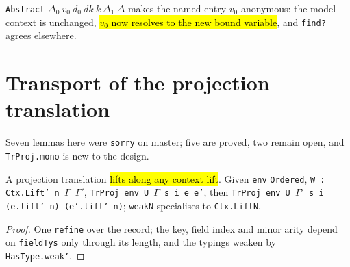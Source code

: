 \begin{definition}
\label{ind:vt-abstract}
\leanok
{}
 \texttt{Abstract} $\Delta_0\ v_0\ d_0\ dk\ k\ \Delta_1\ \Delta$ makes the named entry $v_0$ anonymous: the model context is unchanged, \hl{$v_0$ now resolves to the new bound variable}, and \texttt{find?} agrees elsewhere.
\end{definition}

\section{Transport of the projection translation}

Seven lemmas here were \texttt{sorry} on master; five are proved, two remain open, and \texttt{TrProj.mono} is new to the design.

\begin{theorem}
\label{thm:trproj-weak}
\leanok
{}
 

 A projection translation \hl{lifts along any context lift}. Given \texttt{env} \texttt{Ordered}, \texttt{W : Ctx.Lift' n $\Gamma$ $\Gamma'$}, \texttt{TrProj env U $\Gamma$ s i e e'}, then \texttt{TrProj env U $\Gamma'$ s i (e.lift' n) (e'.lift' n)}; \texttt{weakN} specialises to \texttt{Ctx.LiftN}.
\end{theorem}
\begin{proof}
\leanok
{} One \texttt{refine} over the record; the key, field index and minor arity depend on \texttt{fieldTys} only through its length, and the typings weaken by \texttt{HasType.weak'}.
\end{proof}

